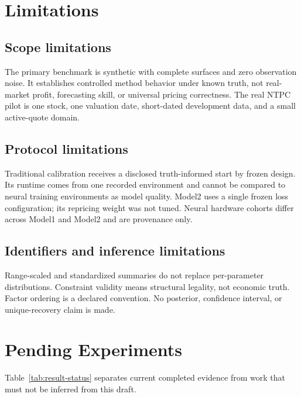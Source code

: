 \section{Limitations}
\label{sec:limitations}

\subsection{Scope limitations}
The primary benchmark is synthetic with complete surfaces and zero observation noise.
It establishes controlled method behavior under known truth, not real-market profit,
forecasting skill, or universal pricing correctness. The real NTPC pilot is one stock,
one valuation date, short-dated development data, and a small active-quote domain.

\subsection{Protocol limitations}
Traditional calibration receives a disclosed truth-informed start by frozen design.
Its runtime comes from one recorded environment and cannot be compared to neural
training environments as model quality. Model2 uses a single frozen loss configuration;
its repricing weight was not tuned. Neural hardware cohorts differ across Model1 and
Model2 and are provenance only.

\subsection{Identifiers and inference limitations}
Range-scaled and standardized summaries do not replace per-parameter distributions.
Constraint validity means structural legality, not economic truth. Factor ordering is a
declared convention. No posterior, confidence interval, or unique-recovery claim is made.

\section{Pending Experiments}
\label{sec:pending-experiments}

Table~\ref{tab:result-status} separates current completed evidence from work that must
not be inferred from this draft.

